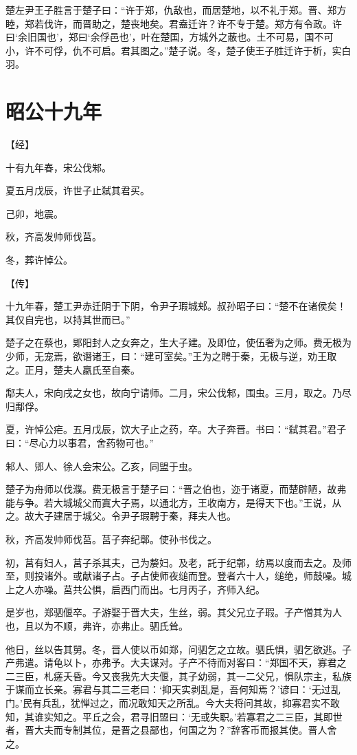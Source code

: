 \documentclass[a4paper,12pt,UTF8,twoside]{ctexbook}
\begin{document}
楚左尹王子胜言于楚子曰：“许于郑，仇敌也，而居楚地，以不礼于郑。晋、郑方睦，郑若伐许，而晋助之，楚丧地矣。君盍迁许？许不专于楚。郑方有令政。许曰‘余旧国也’，郑曰‘余俘邑也’，叶在楚国，方城外之蔽也。土不可易，国不可小，许不可俘，仇不可启。君其图之。”楚子说。冬，楚子使王子胜迁许于析，实白羽。


\section{昭公十九年}




【经】

十有九年春，宋公伐邾。

夏五月戊辰，许世子止弑其君买。

己卯，地震。

秋，齐高发帅师伐莒。

冬，葬许悼公。

【传】

十九年春，楚工尹赤迁阴于下阴，令尹子瑕城郏。叔孙昭子曰：“楚不在诸侯矣！其仅自完也，以持其世而已。”

楚子之在蔡也，郹阳封人之女奔之，生大子建。及即位，使伍奢为之师。费无极为少师，无宠焉，欲谮诸王，曰：“建可室矣。”王为之聘于秦，无极与逆，劝王取之。正月，楚夫人嬴氏至自秦。

鄅夫人，宋向戌之女也，故向宁请师。二月，宋公伐邾，围虫。三月，取之。乃尽归鄅俘。

夏，许悼公疟。五月戊辰，饮大子止之药，卒。大子奔晋。书曰：“弑其君。”君子曰：“尽心力以事君，舍药物可也。”

邾人、郳人、徐人会宋公。乙亥，同盟于虫。

楚子为舟师以伐濮。费无极言于楚子曰：“晋之伯也，迩于诸夏，而楚辟陋，故弗能与争。若大城城父而寘大子焉，以通北方，王收南方，是得天下也。”王说，从之。故大子建居于城父。令尹子瑕聘于秦，拜夫人也。

秋，齐高发帅师伐莒。莒子奔纪鄣。使孙书伐之。

初，莒有妇人，莒子杀其夫，己为嫠妇。及老，託于纪鄣，纺焉以度而去之。及师至，则投诸外。或献诸子占。子占使师夜缒而登。登者六十人，缒绝，师鼓噪。城上之人亦噪。莒共公惧，启西门而出。七月丙子，齐师入纪。

是岁也，郑驷偃卒。子游娶于晋大夫，生丝，弱。其父兄立子瑕。子产憎其为人也，且以为不顺，弗许，亦弗止。驷氏耸。

他日，丝以告其舅。冬，晋人使以币如郑，问驷乞之立故。驷氏惧，驷乞欲逃。子产弗遣。请龟以卜，亦弗予。大夫谋对。子产不待而对客曰：“郑国不天，寡君之二三臣，札瘥夭昏。今又丧我先大夫偃，其子幼弱，其一二父兄，惧队宗主，私族于谋而立长亲。寡君与其二三老曰：‘抑天实剥乱是，吾何知焉？’谚曰：‘无过乱门。’民有兵乱，犹惮过之，而况敢知天之所乱。今大夫将问其故，抑寡君实不敢知，其谁实知之。平丘之会，君寻旧盟曰：‘无或失职。’若寡君之二三臣，其即世者，晋大夫而专制其位，是晋之县鄙也，何国之为？”辞客币而报其使。晋人舍之。
\end{document}
